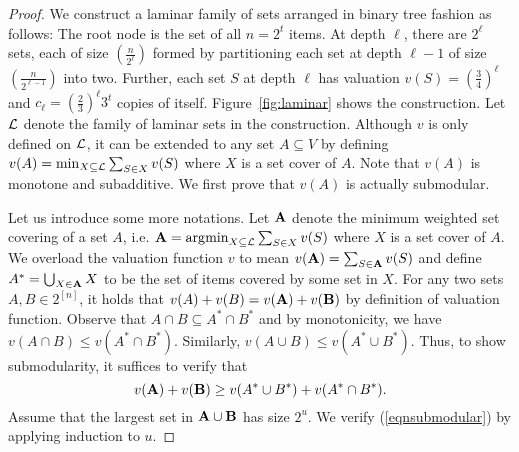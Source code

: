 \begin{proof}

We construct a laminar family of sets arranged in binary tree fashion as follows: The root node is the set of all $n = 2^{t}$ items. At depth $\ell$, there are $2^\ell$ sets, each of size $\left( \frac{n}{2^{\ell}} \right)$ formed by partitioning each set at depth $\ell-1$ of size $\left( \frac{n}{2^{\ell - 1}} \right)$ into two. Further, each set $S$ at depth $\ell$ has valuation $v(S) = \left( \frac{3}{4} \right)^{\ell}$ and $c_\ell = \left( \frac{2}{3} \right)^{\ell} 3^t$ copies of itself. Figure~\ref{fig:laminar} shows the construction. Let $\mathcal{L}$ denote the family of laminar sets in the construction. Although $v$ is only defined on $\mathcal{L}$, it can be extended to any set $A\subseteq V$ by defining $v(A) = \min_{X \subseteq \mathcal{L}} \sum_{S \in X} v(S)$ where $X$ is a set cover of $A$. Note that $v(A)$ is monotone and subadditive. We first prove that $v(A)$ is actually submodular.

Let us introduce some more notations. Let $\mathbf{A}$ denote the minimum weighted set covering of a set $A$, i.e. $\mathbf{A} = \operatorname*{\arg\!\min}_{X \subseteq \mathcal{L}} \sum_{S \in X} v(S)$  where $X$ is a set cover of $A$. We overload the valuation function $v$ to mean $v(\mathbf{A}) = \sum_{S \in \mathbf{A}} v(S)$ and define $A^{*} = \bigcup_{X \in \mathbf{A}} X$ to be the set of items covered by some set in $X$. For any two sets $A, B \in 2^{[n]}$, it holds that $v(A) + v(B) = v(\mathbf{A}) + v(\mathbf{B})$ by definition of valuation function. Observe that $A \cap B \subseteq A^{*} \cap B^{*}$ and by monotonicity, we have $v(A \cap B) \leq v(A^{*} \cap B^{*})$. Similarly, $v(A \cup B) \leq v(A^{*} \cup B^{*})$. Thus, to show submodularity, it suffices to verify that 
\begin{equation}\label{eqnsubmodular}
v(\mathbf{A}) + v(\mathbf{B}) \geq v(A^{*} \cup B^{*}) + v(A^{*} \cap B^{*}).
\end{equation}
Assume that the largest set in $\mathbf{A}\cup \mathbf{B}$ has size $2^u$. We verify (\ref{eqnsubmodular}) by applying induction to $u$.


\end{proof}
